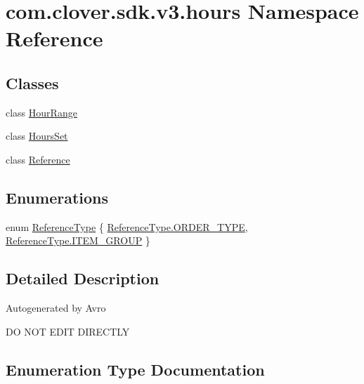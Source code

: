 \hypertarget{namespacecom_1_1clover_1_1sdk_1_1v3_1_1hours}{}\section{com.\+clover.\+sdk.\+v3.\+hours Namespace Reference}
\label{namespacecom_1_1clover_1_1sdk_1_1v3_1_1hours}
\subsection*{Classes}
\begin{DoxyCompactItemize}
\item 
class \hyperlink{classcom_1_1clover_1_1sdk_1_1v3_1_1hours_1_1_hour_range}{Hour\+Range}
\item 
class \hyperlink{classcom_1_1clover_1_1sdk_1_1v3_1_1hours_1_1_hours_set}{Hours\+Set}
\item 
class \hyperlink{classcom_1_1clover_1_1sdk_1_1v3_1_1hours_1_1_reference}{Reference}
\end{DoxyCompactItemize}
\subsection*{Enumerations}
\begin{DoxyCompactItemize}
\item 
enum \hyperlink{namespacecom_1_1clover_1_1sdk_1_1v3_1_1hours_a8525667c21e8dadaefd0a149ff85b867}{Reference\+Type} \{ \hyperlink{namespacecom_1_1clover_1_1sdk_1_1v3_1_1hours_a8525667c21e8dadaefd0a149ff85b867a5f38ace09bd357286362f4feea083e34}{Reference\+Type.\+O\+R\+D\+E\+R\+\_\+\+T\+Y\+PE}, 
\hyperlink{namespacecom_1_1clover_1_1sdk_1_1v3_1_1hours_a8525667c21e8dadaefd0a149ff85b867afdad326a195bcdc85751738f4492f563}{Reference\+Type.\+I\+T\+E\+M\+\_\+\+G\+R\+O\+UP}
 \}
\end{DoxyCompactItemize}


\subsection{Detailed Description}
Autogenerated by Avro

DO N\+OT E\+D\+IT D\+I\+R\+E\+C\+T\+LY 

\subsection{Enumeration Type Documentation}
\mbox{\label{namespacecom_1_1clover_1_1sdk_1_1v3_1_1hours_a8525667c21e8dadaefd0a149ff85b867}} 
